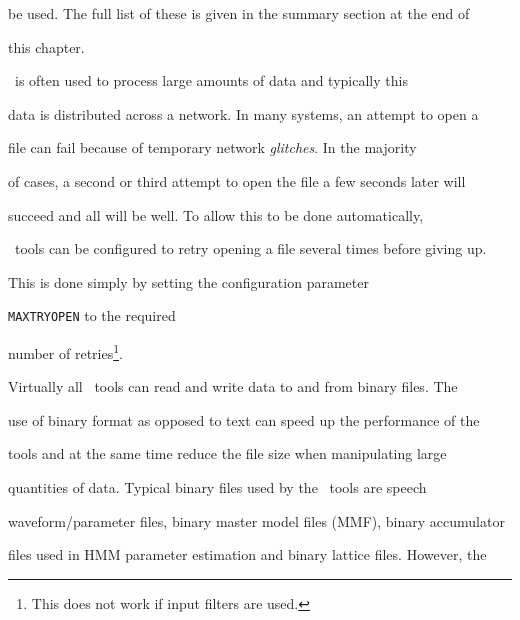 be used.  The full list of these is given in the summary section at the end of


this chapter.





\HTK\ is often used to process large amounts of data and typically this


data is distributed across a network.  In many systems, an attempt to open a


file can fail because of temporary network \textit{glitches}.  In the majority


of cases, a second or third attempt to open the file a few seconds later will


succeed and all will be well.  To allow this to be done automatically, 


\HTK\ tools can be configured to retry opening a file several times before giving up.


This is done simply by setting the configuration parameter


\texttt{MAXTRYOPEN} to the required


number of retries\footnote{ This does not work if input filters are used.  }.


















Virtually all \HTK\ tools can read and write data to and from binary files. The


use of binary format as opposed to text can speed up the performance of the


tools and at the same time reduce the file size when manipulating large


quantities of data.  Typical binary files used by the \HTK\ tools are speech


waveform/parameter files, binary master model files (MMF), binary accumulator


files used in HMM parameter estimation and binary lattice files. However, the


